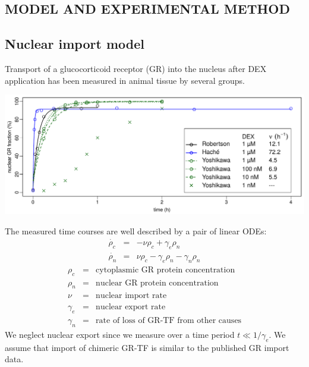 \documentclass[aspb,landscape]{a0poster}
\newlength{\figwidth}
\newlength{\figtopspace}
\begin{document}
\begin{multicols}{3}
  \color{Black}


  \section*{MODEL AND EXPERIMENTAL METHOD}



  \subsection*{Nuclear import model}

  Transport of a glucocorticoid receptor (GR) into the nucleus after DEX application has been measured in animal tissue by several groups.

  \begin{center}\vspace{\figtopspace}
    \includegraphics[width=\figwidth]{robertson-hache-yoshikawa}
  \end{center}
  
  The measured time courses are well described by a pair of linear ODEs:
  \begin{eqnarray*}\label{eq:rho_c_de}
    \dot{\rho_c} &=& -\nu \rho_c + \gamma_e \rho_n \\
    \dot{\rho_n} &=&  \nu \rho_c - \gamma_e \rho_n - \gamma_n \rho_n
  \end{eqnarray*}
  \begin{eqnarray*}
    \rho_c &=& \text{cytoplasmic GR protein concentration} \\
    \rho_n &=& \text{nuclear GR protein concentration} \\
    \nu &=& \text{nuclear import rate} \\
    \gamma_e &=& \text{nuclear export rate} \\
    \gamma_n &=& \text{rate of loss of GR-TF from other causes}
  \end{eqnarray*}
  We neglect nuclear export since we measure over a time period $t \ll 1/\gamma_e$. We assume that import of chimeric GR-TF is similar to the published GR import data.


\end{multicols}
\end{document}
